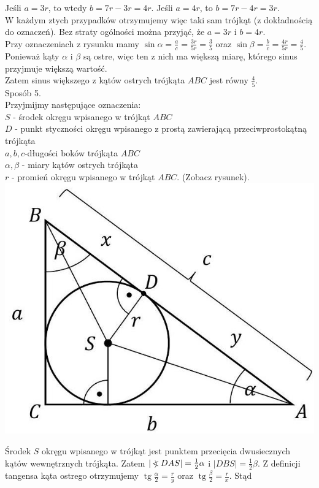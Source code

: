 \documentclass[10pt]{article}
\newcommand\Varangle{\mathop{{<\!\!\!\!\!\text{\small)}}\:}\nolimits}
\begin{document}
Jeśli $a=3 r$, to wtedy $b=7 r-3 r=4 r$. Jeśli $a=4 r$, to $b=7 r-4 r=3 r$.\\
W każdym ztych przypadków otrzymujemy więc taki sam trójkąt (z dokładnością do oznaczeń). Bez straty ogólności można przyjąć, że $a=3 r$ i $b=4 r$.\\
Przy oznaczeniach z rysunku mamy $\sin \alpha=\frac{a}{c}=\frac{3 r}{5 r}=\frac{3}{5}$ oraz $\sin \beta=\frac{b}{c}=\frac{4 r}{5 r}=\frac{4}{5}$. Ponieważ kąty $\alpha$ i $\beta$ są ostre, więc ten z nich ma większą miarę, którego sinus przyjmuje większą wartość.\\
Zatem sinus większego z kątów ostrych trójkąta $A B C$ jest równy $\frac{4}{5}$.\\
Sposób 5.\\
Przyjmijmy następujące oznaczenia:\\
$S$ - środek okręgu wpisanego w trójkąt $A B C$\\
$D$ - punkt styczności okręgu wpisanego z prostą zawierającą przeciwprostokątną trójkąta\\
$a, b, c$-długości boków trójkąta $A B C$\\
$\alpha, \beta$ - miary kątów ostrych trójkąta\\
$r$ - promień okręgu wpisanego w trójkąt $A B C$. (Zobacz rysunek).\\
\includegraphics[max width=\textwidth, center]{2025_02_07_36131546116d12814c9cg-43}

Środek $S$ okręgu wpisanego w trójkąt jest punktem przecięcia dwusiecznych kątów wewnętrznych trójkąta. Zatem $|\Varangle D A S|=\frac{1}{2} \alpha$ i $|D B S|=\frac{1}{2} \beta$. Z definicji tangensa kąta ostrego otrzymujemy $\operatorname{tg} \frac{\alpha}{2}=\frac{r}{y}$ oraz $\operatorname{tg} \frac{\beta}{2}=\frac{r}{x}$. Stąd
\end{document}
